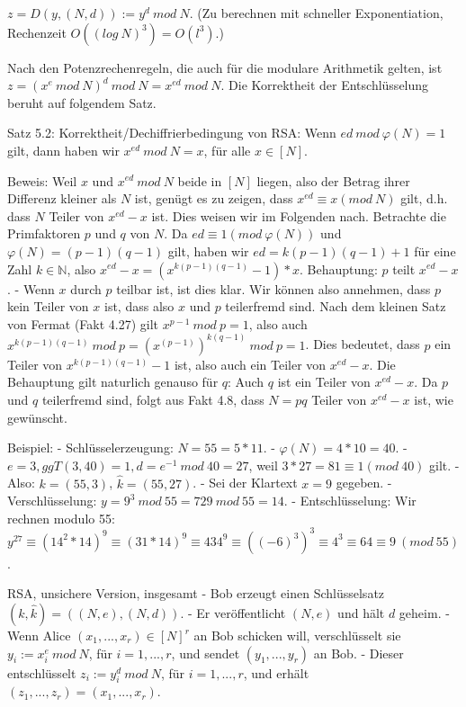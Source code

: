\documentclass[a4paper]{article}
\begin{document}
\begin{multicols}{3}
    $z=D(y,(N,d)) :=y^d\ mod\ N$. (Zu berechnen mit schneller Exponentiation, Rechenzeit $O((log\ N)^3) =O(l^3)$.)

        Nach den Potenzrechenregeln, die auch für die modulare Arithmetik gelten, ist $z=(x^e\ mod\ N)^d\ mod\ N=x^{ed}\ mod\ N$. Die Korrektheit der Entschlüsselung beruht auf folgendem Satz.

        Satz 5.2: Korrektheit/Dechiffrierbedingung von RSA: Wenn $ed\ mod\ \varphi(N) = 1$ gilt, dann haben wir $x^{ed}\ mod\ N=x$, für alle $x\in [N]$.

        Beweis: Weil $x$ und $x^{ed}\ mod\ N$ beide in $[N]$ liegen, also der Betrag ihrer Differenz kleiner als $N$ ist, genügt es zu zeigen, dass $x^{ed} \equiv x(mod\ N)$ gilt, d.h. dass $N$ Teiler von $x^{ed}-x$ ist.
        Dies weisen wir im Folgenden nach. Betrachte die Primfaktoren $p$ und $q$ von $N$. Da $ed\equiv 1 (mod\ \varphi(N))$ und $\varphi(N) = (p-1)(q-1)$ gilt, haben wir $ed=k(p-1)(q-1) + 1$ für eine Zahl $k\in\mathbb{N}$, also $x^{ed}-x= (x^{k(p-1)(q-1)} -1)*x$.
        Behauptung: $p$ teilt $x^{ed}-x$. - Wenn $x$ durch $p$ teilbar ist, ist dies klar. Wir können also annehmen, dass $p$ kein Teiler von $x$ ist, dass also $x$ und $p$ teilerfremd sind. Nach dem kleinen Satz von Fermat (Fakt 4.27) gilt $x^{p-1}\ mod\ p= 1$, also auch $x^{k(p-1)(q-1)}\ mod\ p= (x^{(p-1)})^{k(q-1)}\ mod\ p= 1$.
        Dies bedeutet, dass $p$ ein Teiler von $x^{k(p-1)(q-1)}-1$ ist, also auch ein Teiler von $x^{ed}-x$.
        Die Behauptung gilt naturlich genauso für $q$: Auch $q$ ist ein Teiler von $x^{ed}-x$. Da $p$ und $q$ teilerfremd sind, folgt aus Fakt 4.8, dass $N=pq$ Teiler von $x^{ed}-x$ ist, wie gewünscht.

        Beispiel:
        - Schlüsselerzeugung: $N= 55 = 5*11$.
        - $\varphi(N) = 4*10 = 40$.
        - $e= 3, ggT(3,40) = 1, d=e^{-1}\ mod\ 40 = 27$, weil $3*27 = 81\equiv 1 (mod\ 40)$ gilt.
        - Also: $k= (55,3)$, $\hat{k}= (55,27)$.
        - Sei der Klartext $x=9$ gegeben.
        - Verschlüsselung: $y= 9^3\ mod\ 55 = 729\ mod\ 55 = 14$.
        - Entschlüsselung: Wir rechnen modulo 55: $y^{27}\equiv (14^2 * 14)^9 \equiv (31*14)^9 \equiv 434^9 \equiv ((-6)^3)^3 \equiv 4^3 \equiv 64 \equiv 9\ (mod\ 55)$.

        RSA, unsichere Version, insgesamt
        - Bob erzeugt einen Schlüsselsatz $(k, \hat{k}) = ((N,e),(N,d))$.
        - Er veröffentlicht $(N,e)$ und hält $d$ geheim.
        - Wenn Alice $(x_1,...,x_r)\in [N]^r$ an Bob schicken will, verschlüsselt sie $y_i:=x^e_i\ mod\ N$, für $i=1,...,r$, und sendet $(y_1,...,y_r)$ an Bob.
        - Dieser entschlüsselt $z_i:=y^d_i\ mod\ N$, für $i=1,...,r$, und erhält $(z_1,...,z_r) = (x_1,...,x_r)$.


\end{multicols}
\end{document}
